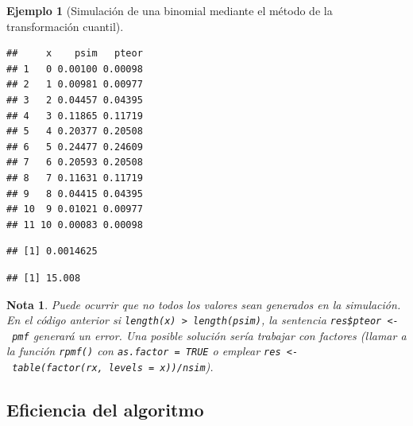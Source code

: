 \documentclass[
]{book}
\newenvironment{Shaded}{\begin{snugshade}}{\end{snugshade}}
\newcommand{\CommentTok}[1]{\textcolor[rgb]{0.56,0.35,0.01}{\textit{#1}}}
\newcommand{\DecValTok}[1]{\textcolor[rgb]{0.00,0.00,0.81}{#1}}
\newcommand{\FunctionTok}[1]{\textcolor[rgb]{0.00,0.00,0.00}{#1}}
\newcommand{\NormalTok}[1]{#1}
\newcommand{\SpecialCharTok}[1]{\textcolor[rgb]{0.00,0.00,0.00}{#1}}
\theoremstyle{break}
\newtheorem{example}{Ejemplo}[chapter]
\theoremstyle{nonumberplain}
\newtheorem{remark}{Nota}
\begin{document}
\begin{example}[Simulación de una binomial mediante el método de la transformación cuantil]
\begin{verbatim}
##     x    psim   pteor
## 1   0 0.00100 0.00098
## 2   1 0.00981 0.00977
## 3   2 0.04457 0.04395
## 4   3 0.11865 0.11719
## 5   4 0.20377 0.20508
## 6   5 0.24477 0.24609
## 7   6 0.20593 0.20508
## 8   7 0.11631 0.11719
## 9   8 0.04415 0.04395
## 10  9 0.01021 0.00977
## 11 10 0.00083 0.00098
\end{verbatim}

\begin{Shaded}
\end{Shaded}

\begin{verbatim}
## [1] 0.0014625
\end{verbatim}

\begin{Shaded}
\end{Shaded}

\begin{verbatim}
## [1] 15.008
\end{verbatim}

\end{example}

\begin{remark}
Puede ocurrir que no todos los valores sean generados en la simulación.
En el código anterior si \texttt{length(x)\ \textgreater{}\ length(psim)}, la sentencia \texttt{res\$pteor\ \textless{}-\ pmf} generará un error.
Una posible solución sería trabajar con factores (llamar a la función \texttt{rpmf()} con \texttt{as.factor\ =\ TRUE} o emplear \texttt{res\ \textless{}-\ table(factor(rx,\ levels\ =\ x))/nsim}).
\end{remark}

\hypertarget{eficiencia-del-algoritmo-1}{%
\subsection{Eficiencia del algoritmo}\label{eficiencia-del-algoritmo-1}}
\end{document}
